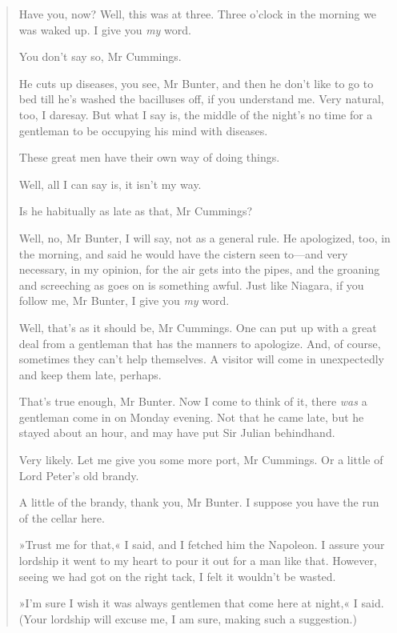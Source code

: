 \begin{quotation}
\begin{dialogue}
 Have you, now? Well, this was at three. Three o'clock in the morning we was waked up. I give you \textit{my} word.

 You don't say so, Mr Cummings.

 He cuts up diseases, you see, Mr Bunter, and then he don't like to go to bed till he's washed the bacilluses off, if you understand me. Very natural, too, I daresay. But what I say is, the middle of the night's no time for a gentleman to be occupying his mind with diseases.

 These great men have their own way of doing things.

 Well, all I can say is, it isn't my way.


 Is he habitually as late as that, Mr Cummings?

 Well, no, Mr Bunter, I will say, not as a general rule. He apologized, too, in the morning, and said he would have the cistern seen to\allowbreak---\allowbreak and very necessary, in my opinion, for the air gets into the pipes, and the groaning and screeching as goes on is something awful. Just like Niagara, if you follow me, Mr Bunter, I give you \textit{my} word.

 Well, that's as it should be, Mr Cummings. One can put up with a great deal from a gentleman that has the manners to apologize. And, of course, sometimes they can't help themselves. A visitor will come in unexpectedly and keep them late, perhaps.

 That's true enough, Mr Bunter. Now I come to think of it, there \textit{was} a gentleman come in on Monday evening. Not that he came late, but he stayed about an hour, and may have put Sir Julian behindhand.

 Very likely. Let me give you some more port, Mr Cummings. Or a little of Lord Peter's old brandy.

 A little of the brandy, thank you, Mr Bunter. I suppose you have the run of the cellar here. 
\end{dialogue}

»Trust me for that,« I said, and I fetched him the Napoleon. I assure your lordship it went to my heart to pour it out for a man like that. However, seeing we had got on the right tack, I felt it wouldn't be wasted.

»I'm sure I wish it was always gentlemen that come here at night,« I said. (Your lordship will excuse me, I am sure, making such a suggestion.)
\end{quotation}

